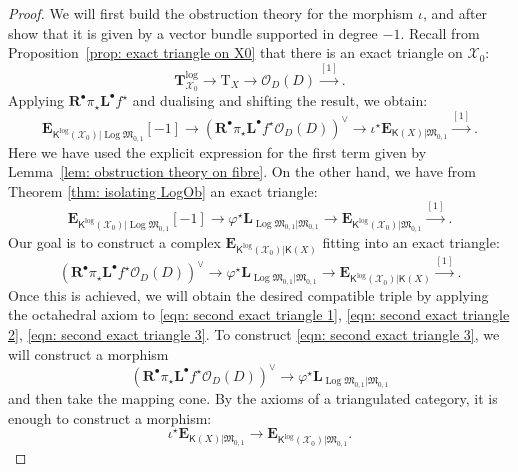 \documentclass[11pt]{amsart}
\theoremstyle{definition}
\theoremstyle{definition}
\newcommand{\EE}{\mathbf{E}}
\newcommand{\LL}{\mathbf{L}}
\newcommand{\op}[1]{\operatorname{#1}}
\newcommand{\TTlog}{\mathbf{T}^{\op{log}}}
\newcommand{\T}{\mathrm{T}}
\newcommand{\OO}{\mathcal{O}}
\newcommand{\Xcal}{\mathcal{X}}
\newcommand{\Mfrak}{\mathfrak{M}}
\newcommand{\Rder}{\mathbf{R}^\bullet}
\newcommand{\Lder}{\mathbf{L}^\bullet}
\newcommand{\Kup}{\mathsf{K}}
\newcommand{\Log}{\operatorname{Log}}
\begin{document}
\begin{proof} We will first build the obstruction theory for the morphism $\iota$, and after show that it is given by a vector bundle supported in degree $-1$. Recall from Proposition~\ref{prop: exact triangle on X0} that there is an exact triangle on $\Xcal_0$:
\begin{equation*} \TTlog_{\Xcal_0} \to \T_X \to  \OO_D(D) \xrightarrow{[1]}. \end{equation*}
Applying $\Rder \pi_\star \Lder f^\star$ and dualising and shifting the result, we obtain:
\begin{equation} \label{eqn: second exact triangle 1} \EE_{\Kup^{\log}(\Xcal_0)|\Log\Mfrak_{0,1}}[-1] \to \left( \Rder \pi_\star \Lder f^\star \OO_D(D) \right)^\vee \to \iota^\star \EE_{\Kup(X)|\Mfrak_{0,1}} \xrightarrow{[1]}.\end{equation}
Here we have used the explicit expression for the first term given by Lemma~\ref{lem: obstruction theory on fibre}. On the other hand, we have from Theorem \ref{thm: isolating LogOb} an exact triangle:
\begin{equation} \label{eqn: second exact triangle 2} \EE_{\Kup^{\log}(\Xcal_0)|\Log\Mfrak_{0,1}}[-1] \to \varphi^\star \LL_{\Log\Mfrak_{0,1}|\Mfrak_{0,1}} \to \EE_{\Kup^{\log}(\Xcal_0)|\Mfrak_{0,1}} \xrightarrow{[1]}.\end{equation}
Our goal is to construct a complex $\EE_{\Kup^{\log}(\Xcal_0)|\Kup(X)}$ fitting into an exact triangle:
\begin{equation} \label{eqn: second exact triangle 3} (\Rder\pi_\star \Lder f^\star \OO_D(D))^\vee \to \varphi^\star \LL_{\Log\Mfrak_{0,1}|\Mfrak_{0,1}} \to \EE_{\Kup^{\log}(\Xcal_0)|\Kup(X)} \xrightarrow{[1]}. \end{equation}
Once this is achieved, we will obtain the desired compatible triple by applying the octahedral axiom to \eqref{eqn: second exact triangle 1}, \eqref{eqn: second exact triangle 2}, \eqref{eqn: second exact triangle 3}. To construct \eqref{eqn: second exact triangle 3}, we will construct a  morphism
\begin{equation}\label{eqn: map from OD(D) to LogOb} (\Rder\pi_\star \Lder f^\star \OO_D(D))^\vee \to \varphi^\star \LL_{\Log\Mfrak_{0,1}|\Mfrak_{0,1}}\end{equation}
and then take the mapping cone. By the axioms of a triangulated category, it is enough to construct a morphism:
\begin{equation*}\iota^\star \EE_{\Kup(X)|\Mfrak_{0,1}} \to \EE_{\Kup^{\log}(\Xcal_0)|\Mfrak_{0,1}}. \end{equation*}

\end{proof}
\end{document}
